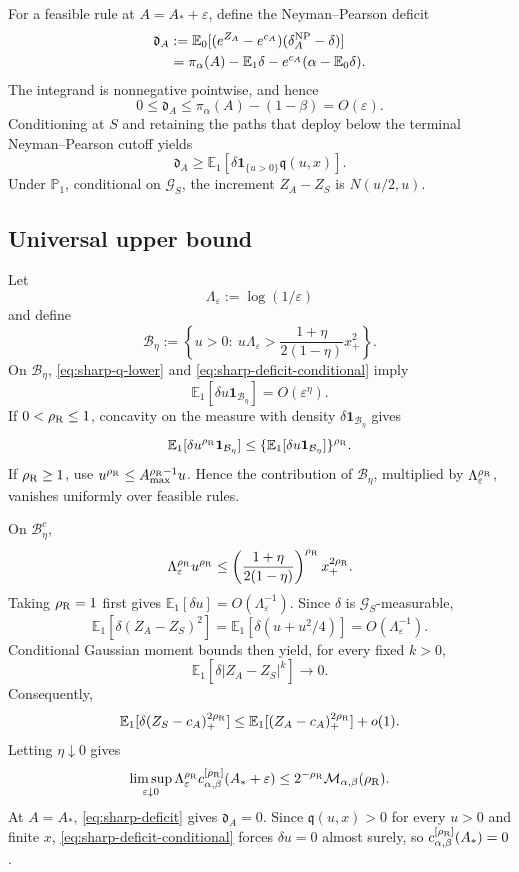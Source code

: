 \documentclass[11pt]{article}
\numberwithin{equation}{section}
\theoremstyle{plain}
\theoremstyle{definition}
\theoremstyle{remark}
\newcommand{\Pone}{\mathbb P_1}
\newcommand{\Ezero}{\mathbb E_0}
\newcommand{\Eone}{\mathbb E_1}
\begin{document}
For a feasible rule at $A=A_*+\varepsilon$, define the Neyman--Pearson deficit
\begin{align}
\mathfrak d_A
&:=\Ezero[(e^{Z_A}-e^{c_A})(\delta_A^{\rm NP}-\delta)]\nonumber\\
&=\pi_\alpha(A)-\Eone\delta-e^{c_A}(\alpha-\Ezero\delta).
\label{eq:sharp-deficit}
\end{align}
The integrand is nonnegative pointwise, and hence
\[
0\le \mathfrak d_A
\le \pi_\alpha(A)-(1-\beta)
=O(\varepsilon).
\]
Conditioning at $S$ and retaining the paths that deploy below the terminal Neyman--Pearson cutoff yields
\begin{equation}\label{eq:sharp-deficit-conditional}
\mathfrak d_A
\ge\Eone[\delta\mathbf1_{\{u>0\}}\mathfrak q(u,x)].
\end{equation}
Under $\Pone$, conditional on $\mathcal G_S$, the increment $Z_A-Z_S$ is $N(u/2,u)$.

\subsection{Universal upper bound}

Let
\[
\Lambda_\varepsilon:=\log(1/\varepsilon)
\]
and define
\[
\mathcal B_\eta
:=\left\{u>0:\ u\Lambda_\varepsilon>
\frac{1+\eta}{2(1-\eta)}x_+^2\right\}.
\]
On $\mathcal B_\eta$, \eqref{eq:sharp-q-lower} and \eqref{eq:sharp-deficit-conditional} imply
\[
\Eone[\delta u\mathbf1_{\mathcal B_\eta}]=O(\varepsilon^\eta).
\]
If $0<\rho_{\rm R}\le1$, concavity on the measure with density $\delta\mathbf1_{\mathcal B_\eta}$ gives
\[
\Eone[\delta u^{\rho_{\rm R}}\mathbf1_{\mathcal B_\eta}]
\le
\{\Eone[\delta u\mathbf1_{\mathcal B_\eta}]\}^{\rho_{\rm R}}.
\]
If $\rho_{\rm R}\ge1$, use $u^{\rho_{\rm R}}\le A_{\max}^{\rho_{\rm R}-1}u$. Hence the contribution of $\mathcal B_\eta$, multiplied by $\Lambda_\varepsilon^{\rho_{\rm R}}$, vanishes uniformly over feasible rules.

On $\mathcal B_\eta^c$,
\[
\Lambda_\varepsilon^{\rho_{\rm R}}u^{\rho_{\rm R}}
\le
\left(\frac{1+\eta}{2(1-\eta)}\right)^{\rho_{\rm R}}
 x_+^{2\rho_{\rm R}}.
\]
Taking $\rho_{\rm R}=1$ first gives $\Eone[\delta u]=O(\Lambda_\varepsilon^{-1})$. Since $\delta$ is $\mathcal G_S$-measurable,
\[
\Eone[\delta(Z_A-Z_S)^2]
=
\Eone[\delta(u+u^2/4)]
=O(\Lambda_\varepsilon^{-1}).
\]
Conditional Gaussian moment bounds then yield, for every fixed $k>0$,
\[
\Eone[\delta|Z_A-Z_S|^k]\longrightarrow0.
\]
Consequently,
\[
\Eone[\delta(Z_S-c_A)_+^{2\rho_{\rm R}}]
\le
\Eone[(Z_A-c_A)_+^{2\rho_{\rm R}}]+o(1).
\]
Letting $\eta\downarrow0$ gives
\[
\limsup_{\varepsilon\downarrow0}
\Lambda_\varepsilon^{\rho_{\rm R}}
 c^{[\rho_{\rm R}]}_{\alpha,\beta}(A_*+\varepsilon)
\le
2^{-\rho_{\rm R}}\mathcal M_{\alpha,\beta}(\rho_{\rm R}).
\]
At $A=A_*$, \eqref{eq:sharp-deficit} gives $\mathfrak d_A=0$. Since $\mathfrak q(u,x)>0$ for every $u>0$ and finite $x$, \eqref{eq:sharp-deficit-conditional} forces $\delta u=0$ almost surely, so
$c^{[\rho_{\rm R}]}_{\alpha,\beta}(A_*)=0$.
\end{document}

